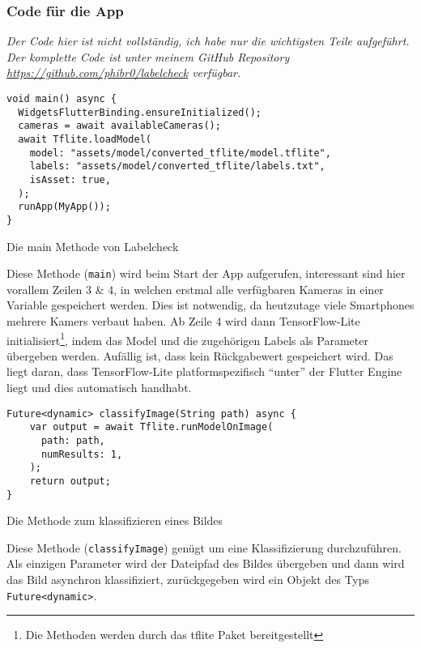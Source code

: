 \subsubsection{Code für die App}

\emph{Der Code hier ist nicht vollständig, ich habe nur die wichtigsten Teile aufgeführt. Der komplette Code ist unter meinem GitHub Repository \url{https://github.com/phibr0/labelcheck} verfügbar.}

\begin{listing}[H]
    \begin{verbatim}
void main() async {
  WidgetsFlutterBinding.ensureInitialized();
  cameras = await availableCameras();
  await Tflite.loadModel(
    model: "assets/model/converted_tflite/model.tflite",
    labels: "assets/model/converted_tflite/labels.txt",
    isAsset: true,
  );
  runApp(MyApp());
}
    \end{verbatim}
    \caption{Die main Methode von Labelcheck}
\end{listing}

Diese Methode (\texttt{main}) wird beim Start der App aufgerufen, interessant sind hier vorallem Zeilen 3 \& 4, in welchen erstmal alle verfügbaren Kameras in einer Variable gespeichert werden. Dies ist notwendig, da heutzutage viele Smartphones mehrere Kamers verbaut haben. Ab Zeile 4 wird dann TensorFlow-Lite initialisiert\footnote{Die Methoden werden durch das tflite Paket bereitgestellt\cite{tflitepackage}}, indem das Model und die zugehörigen Labels als Parameter übergeben werden. Aufällig ist, dass kein Rückgabewert gespeichert wird. Das liegt daran, dass TensorFlow-Lite platformspezifisch "`unter"' der Flutter Engine liegt und dies automatisch handhabt.

\begin{listing}[H]
    \begin{verbatim}
Future<dynamic> classifyImage(String path) async {
    var output = await Tflite.runModelOnImage(
      path: path,
      numResults: 1,
    );
    return output;
}
    \end{verbatim}
    \caption{Die Methode zum klassifizieren eines Bildes}
\end{listing}

Diese Methode (\texttt{classifyImage}) genügt um eine Klassifizierung durchzuführen. Als einzigen Parameter wird der Dateipfad des Bildes übergeben und dann wird das Bild asynchron klassifiziert, zurückgegeben wird ein Objekt des Typs \texttt{Future<dynamic>}.

